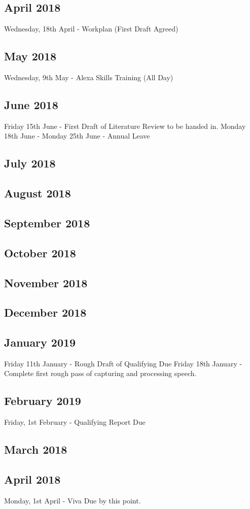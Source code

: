 \documentclass{article}
\begin{document}
	\subsection{April 2018}
	Wednesday, 18th April - Workplan (First Draft Agreed)
	\subsection{May 2018}
	Wednesday, 9th May - Alexa Skills Training (All Day)
	\subsection{June 2018}
	Friday 15th June - First Draft of Literature Review to be handed in.
	\newline
	Monday 18th June - Monday 25th June - Annual Leave
	\subsection{July 2018}
	
	\subsection{August 2018}
	
	\subsection{September 2018}
	
	\subsection{October 2018}

	\subsection{November 2018}
	
	\subsection{December 2018}	
	
	\subsection{January 2019}
	Friday 11th January - Rough Draft of Qualifying Due
	Friday 18th January - Complete first rough pass of capturing and processing speech.
	
	\subsection{February 2019}
	Friday, 1st February - Qualifying Report Due
	
	\subsection{March 2018}
	
	\subsection{April 2018}
	Monday, 1st April - Viva Due by this point.
\end{document}
